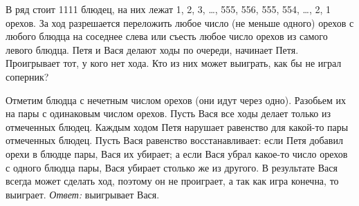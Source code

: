 В ряд стоит 1111 блюдец, на них лежат
1, 2, 3, \ldots, 555, 556, 555, 554, \ldots, 2, 1 орехов.
За ход разрешается переложить любое число (не меньше одного) орехов с любого
блюдца на соседнее слева или съесть любое число орехов из самого левого блюдца.
Петя и Вася делают ходы по очереди, начинает Петя.
Проигрывает тот, у кого нет хода.
Кто из них может выиграть, как бы не играл соперник?

\solution
Отметим блюдца с нечетным числом орехов (они идут через одно).
Разобьем их на пары с одинаковым числом орехов.
Пусть Вася все ходы делает только из отмеченных блюдец.
Каждым ходом Петя нарушает равенство для какой-то пары отмеченных блюдец.
Пусть Вася равенство восстанавливает:
если Петя добавил орехи в блюдце пары, Вася их убирает;
а если Вася убрал какое-то число орехов с одного блюдца пары, Вася убирает
столько же из другого.
В результате Вася всегда может сделать ход, поэтому он не проиграет,
а так как игра конечна, то выиграет.
\emph{Ответ:} выигрывает Вася.

